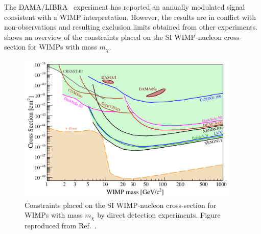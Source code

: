 The DAMA/LIBRA~\cite{Bernabei2018} experiment has reported an annually modulated signal consistent with a WIMP interpretation. However, the results are in conflict with non-observations and resulting exclusion limits obtained from other experiments.
 shows an overview of the constraints placed on the SI WIMP-nucleon cross-section for WIMPs with mass \(m_{\chi}\).
\begin{figure}[htbp]
    \centering
    \includegraphics[width=0.95\textwidth]{figures/darkmatter/directdetection2019_si.png}
    \caption{Constraints placed on the SI WIMP-nucleon cross-section for WIMPs with mass \(m_{\chi}\) by direct detection experiments. Figure reproduced from Ref.~\cite{Schumann2019}.}
    \label{fig:dm:searches:dd:si}
\end{figure}


